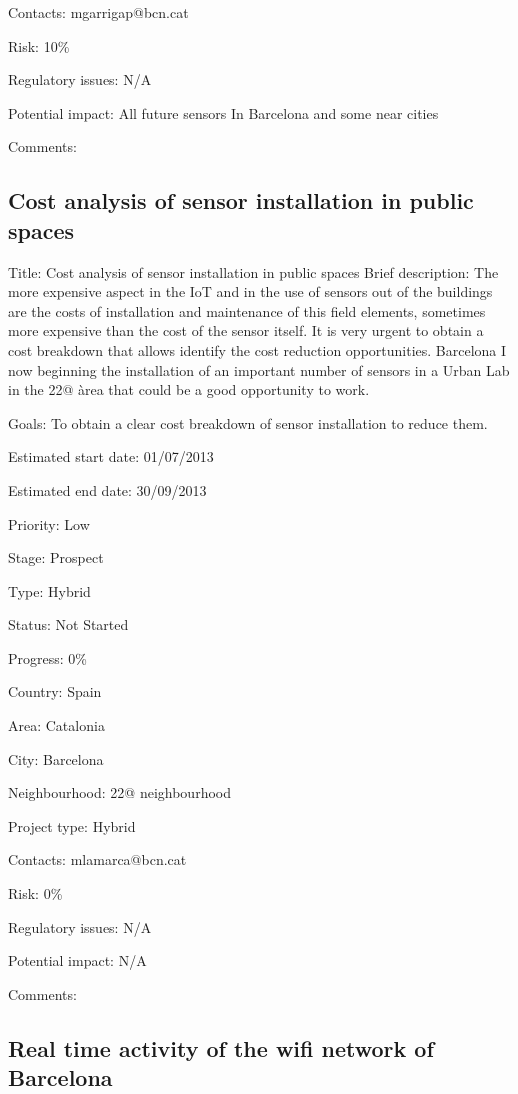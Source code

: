 \documentclass[draftclsnofoot,12pt,journal,onecolumn]{IEEEtran}
\begin{document}
Contacts: mgarrigap@bcn.cat

Risk: 10\% 

Regulatory issues: N/A 

Potential impact: All future sensors In Barcelona and some near cities 

Comments: 

\subsection{Cost analysis of sensor installation in public spaces} 

Title: Cost analysis of sensor installation in public spaces 
Brief description: The more expensive aspect in the IoT and in the use of 
sensors out of the buildings are the costs of installation and maintenance of 
this field elements, sometimes more expensive than the cost of the sensor 
itself.  It is very urgent to obtain a cost breakdown that allows identify 
the cost reduction opportunities.  Barcelona I now beginning the installation 
of an important number of sensors in a Urban Lab in the 22@ àrea that could 
be a good opportunity to work. 

Goals: To obtain a clear cost breakdown of sensor installation to reduce 
them. 

Estimated start date: 01/07/2013 

Estimated end date: 30/09/2013 

Priority: Low 

Stage: Prospect 

Type: Hybrid 

Status: Not Started 

Progress: 0\% 

Country: Spain 

Area: Catalonia 

City: Barcelona 

Neighbourhood: 22@ neighbourhood 

Project type: Hybrid 

Contacts: mlamarca@bcn.cat

Risk: 0\% 

Regulatory issues: N/A 

Potential impact: N/A 

Comments: 

\subsection{Real time activity of the wifi network of Barcelona} 
\end{document}
